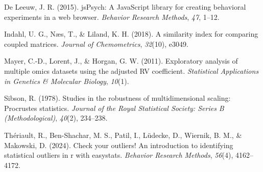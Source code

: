 \documentclass[
  jou,
  floatsintext,
  longtable,
  nolmodern,
  notxfonts,
  notimes,
  colorlinks=true,linkcolor=blue,citecolor=blue,urlcolor=blue]{apa7}
\newlength{\cslhangindent}
\newenvironment{CSLReferences}[2] %
 {\begin{list}{}{%
  \setlength{\itemindent}{0pt}
  \setlength{\leftmargin}{0pt}
  \setlength{\parsep}{0pt}
  \ifodd #1
   \setlength{\leftmargin}{\cslhangindent}
   \setlength{\itemindent}{-1\cslhangindent}
  \fi
  \setlength{\itemsep}{#2\baselineskip}}}
 {\end{list}}
\begin{document}
\label{refs}
\begin{CSLReferences}{1}{0}
De Leeuw, J. R. (2015). jsPsych: A JavaScript library for creating
behavioral experiments in a web browser. \emph{Behavior Research
Methods}, \emph{47}, 1--12.

Indahl, U. G., Næs, T., \& Liland, K. H. (2018). A similarity index for
comparing coupled matrices. \emph{Journal of Chemometrics},
\emph{32}(10), e3049.

Mayer, C.-D., Lorent, J., \& Horgan, G. W. (2011). Exploratory analysis
of multiple omics datasets using the adjusted RV coefficient.
\emph{Statistical Applications in Genetics \& Molecular Biology},
\emph{10}(1).

Sibson, R. (1978). Studies in the robustness of multidimensional
scaling: Procrustes statistics. \emph{Journal of the Royal Statistical
Society: Series B (Methodological)}, \emph{40}(2), 234--238.

Thériault, R., Ben-Shachar, M. S., Patil, I., Lüdecke, D., Wiernik, B.
M., \& Makowski, D. (2024). Check your outliers! An introduction to
identifying statistical outliers in r with easystats. \emph{Behavior
Research Methods}, \emph{56}(4), 4162--4172.

\end{CSLReferences}
\end{document}
